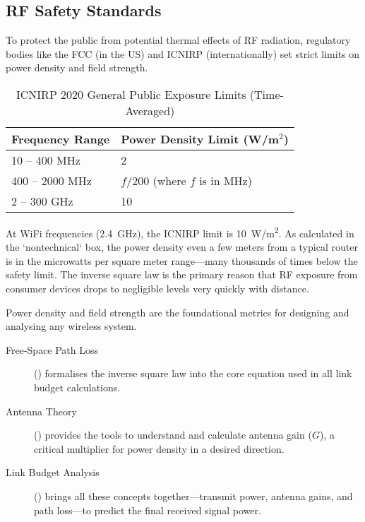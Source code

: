 \subsection{RF Safety Standards}

To protect the public from potential thermal effects of RF radiation, regulatory bodies like the FCC (in the US) and ICNIRP (internationally) set strict limits on power density and field strength.

\begin{table}[H]
    \centering
    \caption{ICNIRP 2020 General Public Exposure Limits (Time-Averaged)}
    \label{tab:icnirp-limits}
    \begin{tabular}{@{}ll@{}}
        \toprule
        \tableheaderfont Frequency Range & \tableheaderfont Power Density Limit (W/m$^2$) \\
        \midrule
        10 -- 400 MHz & 2 \\
        400 -- 2000 MHz & $f/200$ (where $f$ is in MHz) \\
        2 -- 300 GHz & 10 \\
        \bottomrule
    \end{tabular}
\end{table}

\begin{importantbox}[title={Safety in Context}]
    At WiFi frequencies (\qty{2.4}{GHz}), the ICNIRP limit is \qty{10}{W/m^2}. As calculated in the `nontechnical` box, the power density even a few meters from a typical router is in the microwatts per square meter range---many thousands of times below the safety limit. The inverse square law is the primary reason that RF exposure from consumer devices drops to negligible levels very quickly with distance.
\end{importantbox}


\begin{importantbox}[title={Further Reading}]
    Power density and field strength are the foundational metrics for designing and analysing any wireless system.
    \begin{description}
        \item[Free-Space Path Loss] () formalises the inverse square law into the core equation used in all link budget calculations.
        \item[Antenna Theory] () provides the tools to understand and calculate antenna gain ($G$), a critical multiplier for power density in a desired direction.
        \item[Link Budget Analysis] () brings all these concepts together---transmit power, antenna gains, and path loss---to predict the final received signal power.
    \end{description}
\end{importantbox}